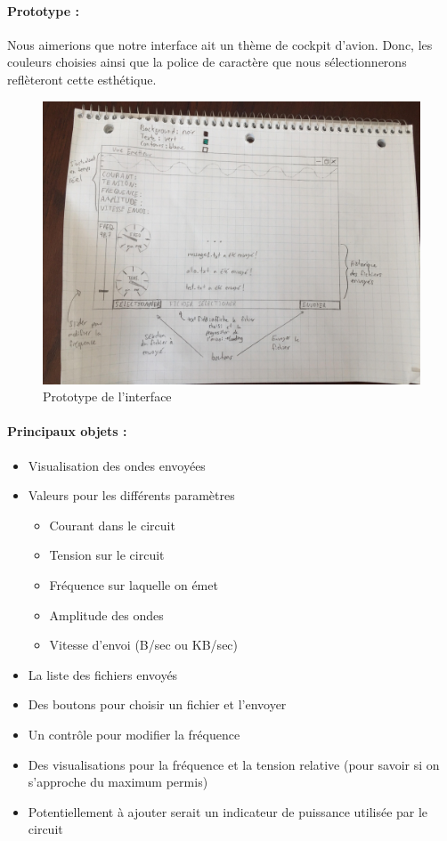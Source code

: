 \paragraph{Prototype :}
Nous aimerions que notre interface ait un thème de cockpit d'avion.
Donc, les couleurs choisies ainsi que la police de caractère que nous sélectionnerons reflèteront cette esthétique.
\begin{figure}[ht!]
    \centering
    \caption{Prototype de l'interface}
    \includegraphics[width=0.8\linewidth]{images/proto/interface_graphique.jpg}
\end{figure}

\newpage

\paragraph{Principaux objets :} 
\begin{itemize}
    \item Visualisation des ondes envoyées
    \item Valeurs pour les différents paramètres 
    \begin{itemize}
        \item Courant dans le circuit
        \item Tension sur le circuit
        \item Fréquence sur laquelle on émet
        \item Amplitude des ondes
        \item Vitesse d'envoi (B/sec ou KB/sec)
    \end{itemize}
    \item La liste des fichiers envoyés
    \item Des boutons pour choisir un fichier et l'envoyer
    \item Un contrôle pour modifier la fréquence
    \item Des visualisations pour la fréquence et la tension relative (pour savoir si on s'approche du maximum permis)
    \item Potentiellement à ajouter serait un indicateur de puissance utilisée par le circuit
\end{itemize}

